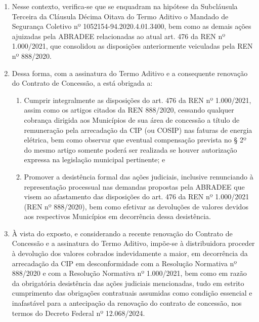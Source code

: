 \begin{enumerate}[resume]
{    Subcláusula Segunda - A DISTRIBUIDORA, de forma expressa e irrevogável, renuncia ao direito sobreo qual se fundam as ações, de qualquer natureza, que visem a questionar as cláusulas do presente TERMO ADITIVO bem como as condições do Decreto nº 12.068, de 2024. 
    
    Subcláusula Terceira - A DISTRIBUIDORA, de forma expressa e irrevogável, se compromete a desistir de eventuais ações judiciais individuais e a abster-se de promover a execução ou valer-se dos efeitos de decisões judiciais proferidas em ações ajuizadas por entidades associativas, em representação, cujo(s)direito(s) sobre os quais se funde a ação contrarie(m) as cláusulas do presente TERMO ADITIVO ou as condições do Decreto nº 12.068, de 2024.
}

\item Nesse contexto, verifica-se que se enquadram na hipótese da Subcláusula Terceira da Cláusula Décima Oitava do Termo Aditivo o Mandado de Segurança Coletivo nº 1052154-94.2020.4.01.3400, bem como as demais ações ajuizadas pela ABRADEE relacionadas ao atual art. 476 da REN nº 1.000/2021, que consolidou as disposições anteriormente veiculadas pela REN nº 888/2020.
\item Dessa forma, com a assinatura do Termo Aditivo e a consequente renovação do Contrato de Concessão, a \nomeConcessionaria{} está obrigada a:

    \begin{enumerate}
        \item Cumprir integralmente as disposições do art. 476 da REN nº 1.000/2021, assim como os artigos citados da REN 888/2020, cessando qualquer cobrança dirigida aos Municípios de sua área de concessão a título de remuneração pela arrecadação da CIP (ou COSIP) nas faturas de energia elétrica, bem como observar que eventual compensação prevista no § 2º do mesmo artigo somente poderá ser realizada se houver autorização expressa na legislação municipal pertinente; e
        \item Promover a desistência formal das ações judiciais, inclusive renunciando à representação processual nas demandas propostas pela ABRADEE que visem ao afastamento das disposições do art. 476 da REN nº 1.000/2021 (REN nº 888/2020), bem como efetivar as devoluções de valores devidos aos respectivos Municípios em decorrência dessa desistência.
    \end{enumerate}

\item À vista do exposto, e considerando a recente renovação do Contrato de Concessão e a assinatura do Termo Aditivo, impõe-se à distribuidora proceder à devolução dos valores cobrados indevidamente a maior, em decorrência da arrecadação da CIP em desconformidade com a Resolução Normativa nº 888/2020 e com a Resolução Normativa nº 1.000/2021, bem como em razão da obrigatória desistência das ações judiciais mencionadas, tudo em estrito cumprimento das obrigações contratuais assumidas como condição essencial e inafastável para a antecipação da renovação do contrato de concessão, nos termos do Decreto Federal nº 12.068/2024.

\end{enumerate}

